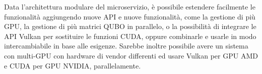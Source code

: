 
Data l'architettura modulare del microservizio, è possibile estendere facilmente le funzionalità aggiungendo nuove API e nuove funzionalità, come la gestione di più GPU, la gestione di più matrici QUBO in parallelo, o la possibilità di integrare le API Vulkan per sostituire le funzioni CUDA, oppure combinarle e usarle in modo intercambiabile in base alle esigenze. Sarebbe inoltre possibile avere un sistema con multi-GPU con hardware di vendor differenti ed usare Vulkan per GPU AMD e CUDA per GPU NVIDIA, parallelamente.


